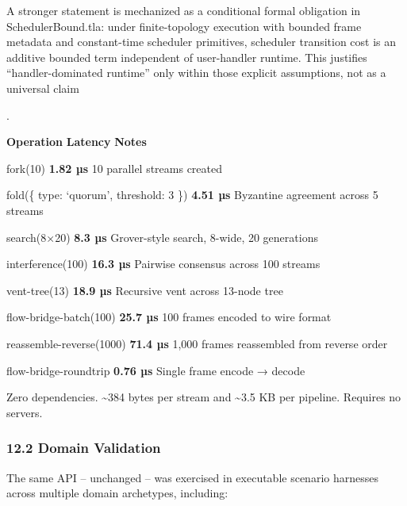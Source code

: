 \documentclass[
]{article}
\begin{document}
A stronger statement is mechanized as a conditional formal obligation in
SchedulerBound.tla: under finite-topology execution with bounded frame
metadata and constant-time scheduler primitives, scheduler transition
cost is an additive bounded term independent of user-handler runtime.
This justifies ``handler-dominated runtime'' only within those explicit
assumptions, not as a universal claim

.

\textbf{Operation} \textbar{} \textbf{Latency} \textbar{} \textbf{Notes}
\textbar{}

fork(10) \textbar{} \textbf{1.82 µs} \textbar{} 10 parallel streams
created \textbar{}

fold(\{ type: `quorum', threshold: 3 \}) \textbar{} \textbf{4.51 µs}
\textbar{} Byzantine agreement across 5 streams \textbar{}

search(8×20) \textbar{} \textbf{8.3 µs} \textbar{} Grover-style search,
8-wide, 20 generations \textbar{}

interference(100) \textbar{} \textbf{16.3 µs} \textbar{} Pairwise
consensus across 100 streams \textbar{}

vent-tree(13) \textbar{} \textbf{18.9 µs} \textbar{} Recursive vent
across 13-node tree \textbar{}

flow-bridge-batch(100) \textbar{} \textbf{25.7 µs} \textbar{} 100 frames
encoded to wire format \textbar{}

reassemble-reverse(1000) \textbar{} \textbf{71.4 µs} \textbar{} 1,000
frames reassembled from reverse order \textbar{}

flow-bridge-roundtrip \textbar{} \textbf{0.76 µs} \textbar{} Single
frame encode → decode \textbar{}

Zero dependencies. \textasciitilde384 bytes per stream and
\textasciitilde3.5 KB per pipeline. Requires no servers.

\subsubsection{\texorpdfstring{\textbf{12.2 Domain
Validation}}{12.2 Domain Validation}}\label{domain-validation}

The same API -- unchanged -- was exercised in executable scenario
harnesses across multiple domain archetypes, including:
\end{document}
